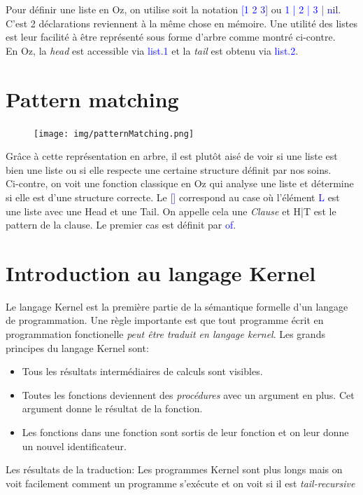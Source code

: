 \documentclass{report}
\begin{document}
Pour définir une liste en Oz, on utilise soit la notation \textcolor{blue}{[1 2 3]} ou \textcolor{blue}{1 | 2 | 3 | nil}. C'est 2 déclarations reviennent à la même chose en mémoire. Une utilité des listes est leur facilité à être représenté sous forme d'arbre comme montré ci-contre.\\
En Oz, la \textit{head} est accessible via \textcolor{blue}{list.1} et la \textit{tail} est obtenu via \textcolor{blue}{list.2}.

\section{Pattern matching}
\begin{figure}
	\centering
	\texttt{[image: img/patternMatching.png]}
\end{figure}
Grâce à cette représentation en arbre, il est plutôt aisé de voir si une liste est bien une liste ou si elle respecte une certaine structure définit par nos soins.\\
Ci-contre, on voit une fonction classique en Oz qui analyse une liste et détermine si elle est d'une structure correcte. Le \textcolor{blue}{[]} correspond au case où l'élément \textcolor{blue}{L} est une liste avec une Head et une Tail. On appelle cela une \textit{Clause} et H|T est le pattern de la clause. Le premier cas est définit par \textcolor{blue}{of}.

\section{Introduction au langage Kernel}
Le langage Kernel est la première partie de la sémantique formelle d'un langage de programmation. Une règle importante est que tout programme écrit en programmation fonctionelle \textit{peut être traduit en langage kernel}.
Les grands principes du langage Kernel sont:
\begin{itemize}
	\item Tous les résultats intermédiaires de calculs sont visibles.
	\item Toutes les fonctions deviennent des \textit{procédures} avec un argument en plus. Cet argument donne le résultat de la fonction.
	\item Les fonctions dans une fonction sont sortis de leur fonction et on leur donne un nouvel identificateur.
\end{itemize}
Les résultats de la traduction: Les programmes Kernel sont plus longs mais on voit facilement comment un programme s'exécute et on voit si il est \textit{tail-recursive}
\end{document}

